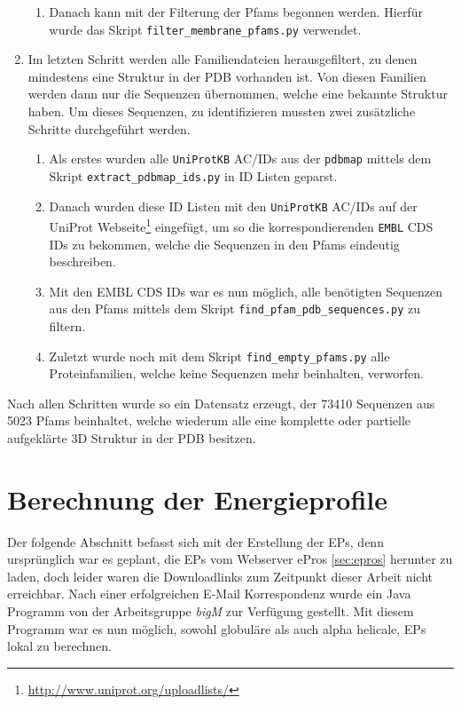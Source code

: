 \begin{enumerate}
\begin{enumerate}
        \item
        Danach kann mit der Filterung der \ac{Pfams} begonnen werden. Hierfür wurde das Skript \texttt{filter\_membrane\_pfams.py} verwendet.
    \end{enumerate}
\item
    Im letzten Schritt werden alle Familiendateien herausgefiltert, zu denen mindestens eine Struktur in der \ac{PDB} vorhanden ist. Von diesen Familien werden dann nur die Sequenzen übernommen, welche eine bekannte Struktur haben. Um dieses Sequenzen, zu identifizieren mussten zwei zusätzliche Schritte durchgeführt werden.
    \begin{enumerate}
        \item
        Als erstes wurden alle \texttt{UniProtKB} AC/IDs aus der \texttt{pdbmap} mittels dem Skript \texttt{extract\_pdbmap\_ids.py} in ID Listen geparst. 
        \item
        Danach wurden diese ID Listen mit den \texttt{UniProtKB} AC/IDs auf der UniProt Webseite\footnote{\url{http://www.uniprot.org/uploadlists/}} eingefügt, um so die korrespondierenden \texttt{EMBL} CDS IDs zu bekommen, welche die Sequenzen in den Pfams eindeutig beschreiben.
        \item
        Mit den EMBL CDS IDs war es nun möglich, alle benötigten Sequenzen aus den Pfams mittels dem Skript \texttt{find\-\_pfam\-\_pdb\-\_sequences.py} zu filtern.
        \item
        Zuletzt wurde noch mit dem Skript \texttt{find\-\_empty\-\_pfams.py} alle Proteinfamilien, welche keine Sequenzen mehr beinhalten, verworfen. 
    \end{enumerate}
\end{enumerate}

Nach allen Schritten wurde so ein Datensatz erzeugt, der 73410 Sequenzen aus 5023 \ac{Pfams} beinhaltet, welche wiederum alle eine komplette oder partielle aufgeklärte 3D Struktur in der \ac{PDB} besitzen.




\section{Berechnung der Energieprofile}
\label{sec:calc_ep}
Der folgende Abschnitt befasst sich mit der Erstellung der \ac{EP}s, denn ursprünglich war es geplant, die \ac{EP}s vom Webserver ePros \ref{sec:epros} herunter zu laden, doch leider waren die Downloadlinks zum Zeitpunkt dieser Arbeit nicht erreichbar. Nach einer erfolgreichen E-Mail Korrespondenz wurde ein Java Programm von der Arbeitsgruppe \emph{bigM} zur Verfügung gestellt. Mit diesem Programm war es nun möglich, sowohl globuläre als auch alpha helicale, \ac{EP}s lokal zu berechnen. 

